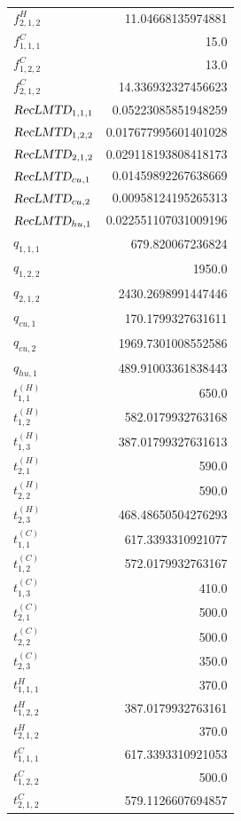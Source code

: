 \documentclass{article}%
\begin{document}
\begin{multicols*}{3}
\begin{supertabular}{lr}
	$f_{2,1,2}^{H}$ & 11.04668135974881 \\%
	$f_{1,1,1}^{C}$ & 15.0 \\%
	$f_{1,2,2}^{C}$ & 13.0 \\%
	$f_{2,1,2}^{C}$ & 14.336932327456623 \\%
	$\textsl{RecLMTD}_{1,1,1}$ & 0.05223085851948259 \\%
	$\textsl{RecLMTD}_{1,2,2}$ & 0.017677995601401028 \\%
	$\textsl{RecLMTD}_{2,1,2}$ & 0.029118193808418173 \\%
	$\textsl{RecLMTD}_{cu,1}$ & 0.01459892267638669 \\%
	$\textsl{RecLMTD}_{cu,2}$ & 0.00958124195265313 \\%
	$\textsl{RecLMTD}_{hu,1}$ & 0.022551107031009196 \\%
	$q_{1,1,1}$ & 679.820067236824 \\%
	$q_{1,2,2}$ & 1950.0 \\%
	$q_{2,1,2}$ & 2430.2698991447446 \\%
	$q_{cu,1}$ & 170.1799327631611 \\%
	$q_{cu,2}$ & 1969.7301008552586 \\%
	$q_{hu,1}$ & 489.91003361838443 \\%
	$t_{1,1}^{(H)}$ & 650.0 \\%
	$t_{1,2}^{(H)}$ & 582.0179932763168 \\%
	$t_{1,3}^{(H)}$ & 387.01799327631613 \\%
	$t_{2,1}^{(H)}$ & 590.0 \\%
	$t_{2,2}^{(H)}$ & 590.0 \\%
	$t_{2,3}^{(H)}$ & 468.48650504276293 \\%
	$t_{1,1}^{(C)}$ & 617.3393310921077 \\%
	$t_{1,2}^{(C)}$ & 572.0179932763167 \\%
	$t_{1,3}^{(C)}$ & 410.0 \\%
	$t_{2,1}^{(C)}$ & 500.0 \\%
	$t_{2,2}^{(C)}$ & 500.0 \\%
	$t_{2,3}^{(C)}$ & 350.0 \\%
	$t_{1,1,1}^{H}$ & 370.0 \\%
	$t_{1,2,2}^{H}$ & 387.0179932763161 \\%
	$t_{2,1,2}^{H}$ & 370.0 \\%
	$t_{1,1,1}^{C}$ & 617.3393310921053 \\%
	$t_{1,2,2}^{C}$ & 500.0 \\%
	$t_{2,1,2}^{C}$ & 579.1126607694857 \\%

\end{supertabular}
\end{multicols*}
\end{document}
